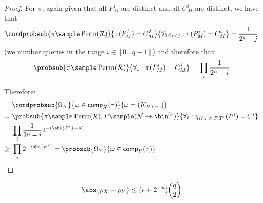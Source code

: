 \documentclass[eprint.tex]{subfiles}
\begin{document}
\begin{proof}
    For $\pi$, again given that all $P_M^i$ are distinct and all $C_M^i$ are distinct,
    we have that
    \begin{displaymath}
        \condprobsub{
            \pi \sample \Perm(\mathcal{R})
        }{
            \pi(P_M^j) = C_M^j
        }{
            \forall_{0 \leq i < j} : \pi(P_M^i) = C_M^i
        } = \frac{1}{2^n - j}
    \end{displaymath}
    (we number queries in the range $i \in [0 \ldots q-1]$) and therefore that:
    \begin{displaymath}
        \probsub{
            \pi \sample \Perm(\mathcal{R})
        }{
            \forall_i : \pi(P_M^i) = C_M^i
        } = \prod_i \frac{1}{2^n - i}
    \end{displaymath}

    Therefore:
    \begin{align*}
        {}&\condprobsub{\Omega_X}{\omega \in \comp_X(\tau)}{\omega = (K_H, ., .)} \\
        ={}& \probsub{
            \pi \sample \Perm(\mathcal{R}),
            F \sample (\mathcal{N} \rightarrow \bin^{l_S})
        }{
            \forall_i : \eta_{K_H, \pi, F, T^i}(P^i) = C^i
        } \\
        ={}& \prod_i \frac{1}{2^n - i}2^{-(\abs{P^i} - n)} \\
        \geq {}& \prod_i 2^{-\abs{P^i}} = \probsub{\Omega_Y}{\omega \in \comp_Y(\tau)} \qedhere \\
    \end{align*}
\end{proof}

\begin{lemma} \label{xyadv}
    \begin{displaymath}
        \abs{\rho_X - \rho_Y}
        \leq (\epsilon + 2^{-n})\binom{q}{2}
    \end{displaymath}
\end{lemma}
\end{document}
